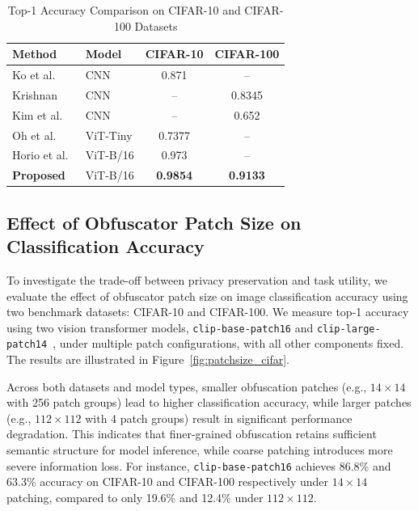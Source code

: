 \documentclass{ieeeaccess}
\newcommand{\rev}[1]{{\color{green}#1}}
\begin{document}
\begin{table}[t!]
\centering
\caption{Top-1 Accuracy Comparison on CIFAR-10 and CIFAR-100 Datasets}
\label{tab:accuracy-comparison}
\begin{tabular}{l l c c}
\toprule
\textbf{Method} & \textbf{Model} & \textbf{CIFAR-10} & \textbf{CIFAR-100} \\
\midrule
Ko et al.~\cite{9129656}       & CNN           & 0.871   & --      \\
Krishnan~\cite{10.1007/978-3-031-37586-6_18}        & CNN           & --      & 0.8345  \\
Kim et al.~\cite{s24103166}      & CNN           & --      & 0.652   \\
Oh et al.~\cite{oh2022differentially}       & ViT-Tiny      & 0.7377  & --      \\
Horio et al.~\cite{horio2024privacypreservingvisiontransformerusing} & ViT-B/16      & 0.973   & --      \\
\rev{\textbf{Proposed}} & \rev{ViT-B/16}    & \rev{\textbf{0.9854}} & \rev{\textbf{0.9133}} \\
\bottomrule
\end{tabular}
\end{table}

\subsection{Effect of Obfuscator Patch Size on Classification Accuracy}
\label{sec:eval:patchsize}

To investigate the trade-off between privacy preservation and task utility, we evaluate the effect of obfuscator patch size on image classification accuracy using two benchmark datasets: CIFAR-10 and CIFAR-100. We measure top-1 accuracy using two vision transformer models, \texttt{clip-base-patch16} and \texttt{clip-large-patch14}~\cite{radford2021learningtransferablevisualmodels}, under multiple patch configurations, with all other components fixed. The results are illustrated in Figure~\ref{fig:patchsize_cifar}.

Across both datasets and model types, smaller obfuscation patches (e.g., $14\times14$ with 256 patch groups) lead to higher classification accuracy, while larger patches (e.g., $112\times112$ with 4 patch groups) result in significant performance degradation. This indicates that finer-grained obfuscation retains sufficient semantic structure for model inference, while coarse patching introduces more severe information loss. For instance, \texttt{clip-base-patch16} achieves 86.8\% and 63.3\% accuracy on CIFAR-10 and CIFAR-100 respectively under $14\times14$ patching, compared to only 19.6\% and 12.4\% under $112\times112$.
\end{document}
